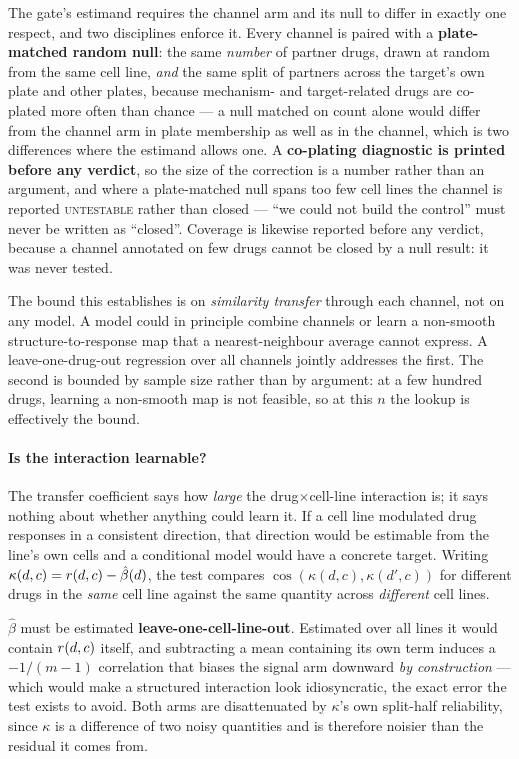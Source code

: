 The gate's estimand requires the channel arm and its null to differ in exactly one respect, and two
disciplines enforce it. Every channel is paired with a \textbf{plate-matched random null}: the same
\emph{number} of partner drugs, drawn at random from the same cell line, \emph{and} the same split
of partners across the target's own plate and other plates, because mechanism- and target-related
drugs are co-plated more often than chance --- a null matched on count alone would differ from the
channel arm in plate membership as well as in the channel, which is two differences where the
estimand allows one. A \textbf{co-plating diagnostic is printed before any verdict}, so the size of
the correction is a number rather than an argument, and where a plate-matched null spans too few
cell lines the channel is reported \textsc{untestable} rather than closed --- ``we could not build
the control'' must never be written as ``closed''. Coverage is likewise reported before any
verdict, because a channel annotated on few drugs cannot be closed by a null result: it was never
tested.

The bound this establishes is on \emph{similarity transfer} through each channel, not on any model.
A model could in principle combine channels or learn a non-smooth structure-to-response map that a
nearest-neighbour average cannot express. A leave-one-drug-out regression over all channels jointly
addresses the first. The second is bounded by sample size rather than by argument: at a few hundred
drugs, learning a non-smooth map is not feasible, so at this $n$ the lookup is effectively the bound.

\paragraph{Is the interaction learnable?} The transfer coefficient says how \emph{large} the
drug$\times$cell-line interaction is; it says nothing about whether anything could learn it. If a cell
line modulated drug responses in a consistent direction, that direction would be estimable from the
line's own cells and a conditional model would have a concrete target. Writing
$\kappa(d,c) = r(d,c) - \hat{\beta}(d)$, the test compares $\cos(\kappa(d,c), \kappa(d',c))$ for
different drugs in the \emph{same} cell line against the same quantity across \emph{different} cell
lines.

$\hat{\beta}$ must be estimated \textbf{leave-one-cell-line-out}. Estimated over all lines it would
contain $r(d,c)$ itself, and subtracting a mean containing its own term induces a $-1/(m-1)$
correlation that biases the signal arm downward \emph{by construction} --- which would make a
structured interaction look idiosyncratic, the exact error the test exists to avoid. Both arms are
disattenuated by $\kappa$'s own split-half reliability, since $\kappa$ is a difference of two noisy
quantities and is therefore noisier than the residual it comes from.

